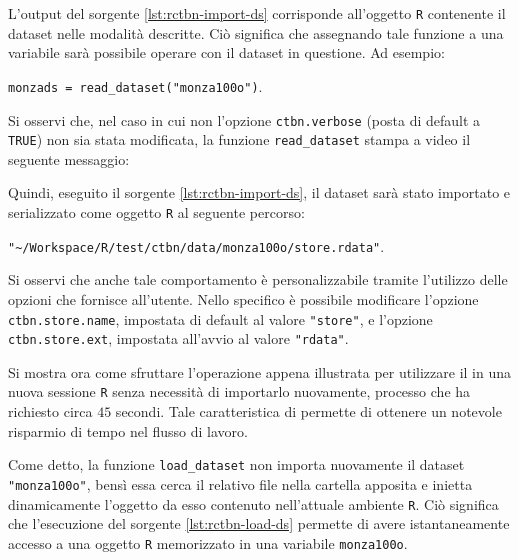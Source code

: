 L'output del sorgente \ref{lst:rctbn-import-ds} corrisponde all'oggetto \lstinline$R$ contenente il dataset nelle modalità descritte. Ciò significa che assegnando tale funzione a una variabile sarà possibile operare con il dataset in questione. Ad esempio:

\lstinline[language=rstats]{monzads = read_dataset("monza100o")}.

Si osservi che, nel caso in cui non l'opzione \lstinline$ctbn.verbose$ (posta di default a \lstinline[language=rstats]{TRUE}) non sia stata modificata, la funzione \lstinline[language=rstats]{read_dataset} stampa a video il seguente messaggio:

\vspace*{8pt}\vspace*{8pt}

Quindi, eseguito il sorgente \ref{lst:rctbn-import-ds}, il dataset sarà stato importato e serializzato come oggetto \lstinline$R$ al seguente percorso:

\lstinline[language=rstats]{"~/Workspace/R/test/ctbn/data/monza100o/store.rdata"}.

Si osservi che anche tale comportamento è personalizzabile tramite l'utilizzo delle opzioni che \rctbn{} fornisce all'utente. Nello specifico è possibile modificare l'opzione \lstinline$ctbn.store.name$, impostata di default al valore \lstinline[language=rstats]{"store"}, e l'opzione \lstinline$ctbn.store.ext$, impostata all'avvio al valore \lstinline[language=rstats]{"rdata"}.

Si mostra ora come sfruttare l'operazione appena illustrata per utilizzare il  in una nuova sessione \lstinline$R$ senza necessità di importarlo nuovamente, processo che ha richiesto circa $45$ secondi. Tale caratteristica di \rctbn{} permette di ottenere un notevole risparmio di tempo nel flusso di lavoro.

\vspace*{8pt}
Come detto, la funzione \lstinline[language=rstats]{load_dataset} non importa nuovamente il dataset \lstinline[language=rstats]{"monza100o"}, bensì essa cerca il relativo file  nella cartella apposita e inietta dinamicamente l'oggetto da esso contenuto nell'attuale ambiente \lstinline$R$. Ciò significa che l'esecuzione del sorgente \ref{lst:rctbn-load-ds} permette di avere istantaneamente accesso a una oggetto \lstinline$R$ memorizzato in una variabile \lstinline$monza100o$.

